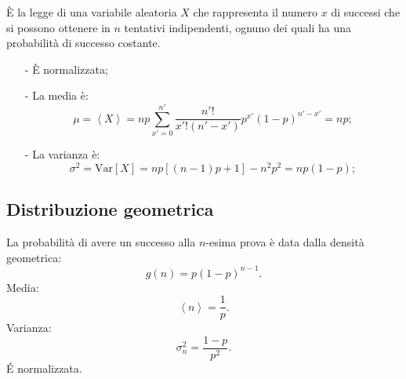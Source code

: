 \`E la legge di una variabile aleatoria $X$ che rappresenta il numero $x$ di successi che si possono ottenere in $n$ tentativi indipendenti, ognuno dei quali ha una probabilità di successo costante.
\begin{itemize}
\item[-] \`E normalizzata;
\item[-] La media è:
\begin{equation} 
\mu =\left< X \right> =np\sum _{ x'=0 }^{ n' }{ \frac { n'! }{ x'!(n'-x') } { p }^{ x' }{ \left( 1-p \right)  }^{ n'-x' } } =np;
\end{equation}
\item[-] La varianza è:
\begin{equation}
{ \sigma  }^{ 2 }=\textrm{Var}\left[ X \right] =np\left[ \left( n-1 \right) p+1 \right] -{ n }^{ 2 }{ p }^{ 2 }=np\left( 1-p \right);
\end{equation}
\end{itemize}

\subsection{Distribuzione geometrica} %
\label{sec:geometrica}
La probabilità di avere un successo alla $n$-esima prova è data dalla densità geometrica:
\begin{equation}
\label{eq:geometrica}
g\left( n \right) =p{ \left( 1-p \right)  }^{ n-1 }.
\end{equation}
Media:
\begin{equation}
\left< n \right> =\frac { 1 }{ p } .
\end{equation}
Varianza:
\begin{equation}
{ \sigma  }_{ n }^{ 2 }=\frac { 1-p }{ { p }^{ 2 } } .
\end{equation}
\'E normalizzata.

